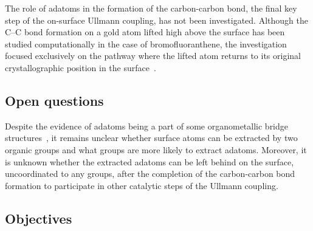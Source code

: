 \documentclass[%
 reprint,
 amsmath,amssymb,
 aps,
prb,
floatfix,
]{revtex4-2}
\newcommand{\lock}{\color{red}}
\newcommand{\lock}{\color{red}}
\begin{document}

{\lock

The role of adatoms in the formation of the carbon-carbon bond, the final key step of the on-surface Ullmann coupling, has not been investigated. Although the C--C bond formation on a gold atom lifted high above the surface has been studied computationally in the case of bromofluoranthene,
the investigation focused exclusively on the pathway where the lifted atom returns to its original crystallographic position in the surface~\cite{jpcc2018}. 

}

\ifdefined\INTERNAL

\subsection{Open questions}

\fi
{\lock

Despite the evidence of adatoms being a part of some organometallic bridge structures~\cite{acsnano2017, acsnano2019}, it remains unclear whether surface atoms can be extracted by two organic groups and what groups are more likely to extract adatoms. Moreover, it is unknown whether the extracted adatoms can be left behind on the surface, uncoordinated to any groups, after the completion of the carbon-carbon bond formation to participate in other catalytic steps of the Ullmann coupling.


}

\ifdefined\INTERNAL

\subsection{Objectives}
\end{document}
